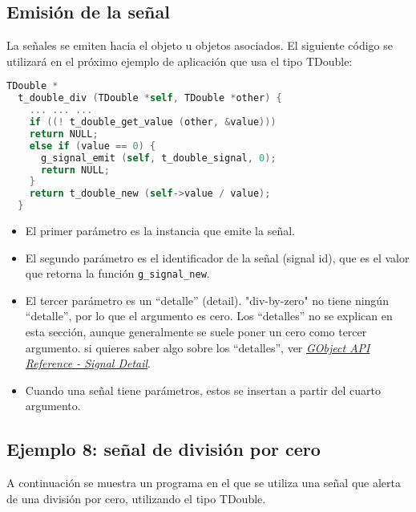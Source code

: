 \subsection{Emisión de la señal}
La señales se emiten hacia el objeto u objetos asociados. El siguiente código se utilizará en
el próximo ejemplo de aplicación que usa el tipo \textsf{TDouble}:
\begin{lstlisting}[language=C, numbers=none]
  TDouble *
  t_double_div (TDouble *self, TDouble *other) {
    ... ... ...
    if ((! t_double_get_value (other, &value)))
    return NULL;
    else if (value == 0) {
      g_signal_emit (self, t_double_signal, 0);
      return NULL;
    }
    return t_double_new (self->value / value);
  }
\end{lstlisting}

\begin{itemize}
  \tightlist
\item El primer parámetro es la instancia que emite la señal.
\item El segundo parámetro es el identificador de la señal (\textsf{signal id}), que es el valor que
  retorna la función \texttt{g\_signal\_new}.
\item El tercer parámetro es un ``detalle'' (\textsf{detail}). \textsf{"div-by-zero"} no tiene ningún ``detalle'',
  por lo que el argumento es cero. Los ``detalles'' no se explican en esta sección, aunque generalmente se
  suele poner un cero como tercer argumento. si quieres saber algo sobre los ``detalles'', ver
  \href{https://docs.gtk.org/gobject/concepts.html#the-detail-argument}
  {\emph{\textsf{GObject API Reference - Signal Detail}}}.
\item Cuando una señal tiene parámetros, estos se insertan a partir del cuarto argumento.
\end{itemize}

\subsection{Ejemplo 8: señal de división por cero}
A continuación se muestra un programa en el que se utiliza una señal que alerta de una división por cero,
utilizando el tipo \textsf{TDouble}.

